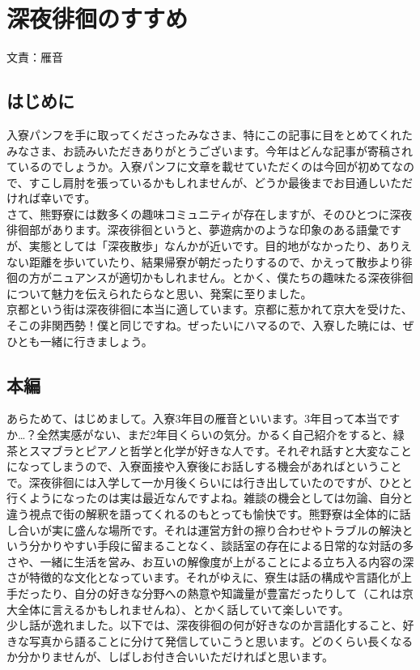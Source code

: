 

\section{深夜徘徊のすすめ}
文責：雁音
\subsection{はじめに}
入寮パンフを手に取ってくださったみなさま、特にこの記事に目をとめてくれたみなさま、お読みいただきありがとうございます。今年はどんな記事が寄稿されているのでしょうか。入寮パンフに文章を載せていただくのは今回が初めてなので、すこし肩肘を張っているかもしれませんが、どうか最後までお目通しいただければ幸いです。\\ \indent 
さて、熊野寮には数多くの趣味コミュニティが存在しますが、そのひとつに深夜徘徊部があります。深夜徘徊というと、夢遊病かのような印象のある語彙ですが、実態としては「深夜散歩」なんかが近いです。目的地がなかったり、ありえない距離を歩いていたり、結果帰寮が朝だったりするので、かえって散歩より徘徊の方がニュアンスが適切かもしれません。とかく、僕たちの趣味たる深夜徘徊について魅力を伝えられたらなと思い、発案に至りました。\\ \indent 
京都という街は深夜徘徊に本当に適しています。京都に惹かれて京大を受けた、そこの非関西勢！僕と同じですね。ぜったいにハマるので、入寮した暁には、ぜひとも一緒に行きましょう。

\subsection{本編}
あらためて、はじめまして。入寮3年目の雁音といいます。3年目って本当ですか…？全然実感がない、まだ2年目くらいの気分。かるく自己紹介をすると、緑茶とスマブラとピアノと哲学と化学が好きな人です。それぞれ話すと大変なことになってしまうので、入寮面接や入寮後にお話しする機会があればということで。深夜徘徊には入学して一か月後くらいには行き出していたのですが、ひとと行くようになったのは実は最近なんですよね。雑談の機会としては勿論、自分と違う視点で街の解釈を語ってくれるのもとっても愉快です。熊野寮は全体的に話し合いが実に盛んな場所です。それは運営方針の擦り合わせやトラブルの解決という分かりやすい手段に留まることなく、談話室の存在による日常的な対話の多さや、一緒に生活を営み、お互いの解像度が上がることによる立ち入る内容の深さが特徴的な文化となっています。それがゆえに、寮生は話の構成や言語化が上手だったり、自分の好きな分野への熱意や知識量が豊富だったりして（これは京大全体に言えるかもしれませんね）、とかく話していて楽しいです。\\ \indent
少し話が逸れました。以下では、深夜徘徊の何が好きなのか言語化すること、好きな写真から語ることに分けて発信していこうと思います。どのくらい長くなるか分かりませんが、しばしお付き合いいただければと思います。\\ \indent
